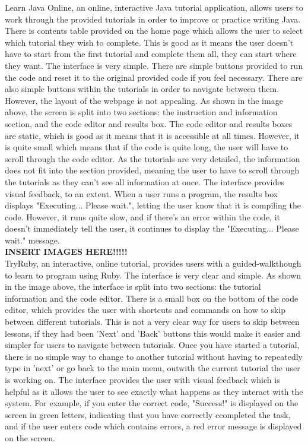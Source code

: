 \documentclass{article}
\begin{document}
Learn Java Online, an online, interactive Java tutorial application, allows users to work through the provided tutorials in order to improve or practice writing Java. There is contents table provided on the home page which allows the user to select which tutorial they wish to complete. This is good as it means the user doesn't have to start from the first tutorial and complete them all, they can start where they want. The interface is very simple. There are simple buttons provided to run the code and reset it to the original provided code if you feel necessary. There are also simple buttons within the tutorials in order to navigate between them. However, the layout of the webpage is not appealing. As shown in the image above, the screen is split into two sections: the instruction and information section, and the code editor and results box. The code editor and results boxes are static, which is good as it means that it is accessible at all times. However, it is quite small which means that if the code is quite long, the user will have to scroll through the code editor. As the tutorials are very detailed, the information does not fit into the section provided, meaning the user to have to scroll through the tutorials as they can't see all information at once. The interface provides visual feedback, to an extent. When a user runs a program, the results box displays "Executing... Please wait.", letting the user know that it is compiling the code. However, it runs quite slow, and if there's an error within the code, it doesn't immediately tell the user, it continues to display the "Executing... Please wait." message.\\

\textbf{INSERT IMAGES HERE!!!!!}\\

TryRuby, an interactive, online tutorial, provides users with a guided-walkthough to learn to program using Ruby. The interface is very clear and simple. As shown in the image above, the interface is split into two sections: the tutorial information and the code editor. There is a small box on the bottom of the code editor, which provides the user with shortcuts and commands on how to skip between different tutorials. This is not a very clear way for users to skip between lessons, if they had been 'Next' and 'Back' buttons this would make it easier and simpler for users to navigate between tutorials. Once you have started a tutorial, there is no simple way to change to another tutorial without having to repeatedly type in 'next' or go back to the main menu, outwith the current tutorial the user is working on. The interface provides the user with visual feedback which is helpful as it allows the user to see exactly what happens as they interact with the system. For example, if you enter the correct code, "Success!" is displayed on the screen in green letters, indicating that you have correctly ccompleted the task, and if the user enters code which contains errors, a red error message is displayed on the screen.\\
\end{document}
